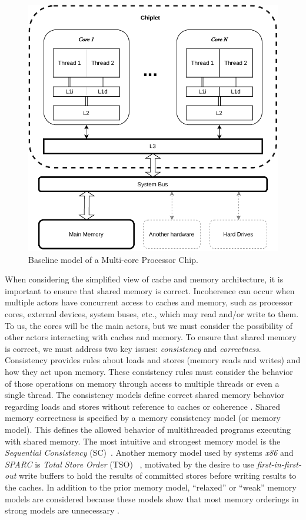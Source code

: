 \begin{figure}[ht!]
    \centering
    \includegraphics[width=0.7\linewidth]{contents//figures/III_2_cpu.pdf}
    \caption{Baseline model of a Multi-core Processor Chip.}
    \label{fig:multi-core-processor}
\end{figure}

When considering the simplified view of cache and memory architecture, it is important to ensure that shared memory is correct. Incoherence can occur when multiple actors have concurrent access to caches and memory, such as processor cores, external devices, system buses, etc., which may read and/or write to them. To us, the cores will be the main actors, but we must consider the possibility of other actors interacting with caches and memory.
To ensure that shared memory is correct, we must address two key issues: \emph{consistency} and \emph{correctness}. Consistency provides rules about loads and stores (memory reads and writes) and how they act upon memory. These consistency rules must consider the behavior of those operations on memory through access to multiple threads or even a single thread. The consistency models define correct shared memory behavior regarding loads and stores without reference to caches or coherence \cite{DBLP_series_synthesis_2020Nagarajan}. Shared memory correctness is specified by a memory consistency model (or memory model). This defines the allowed behavior of multithreaded programs executing with shared memory. The most intuitive and strongest memory model is the \emph{Sequential Consistency} (SC)~\cite{lamport1979how}. Another memory model used by systems \emph{x86} and \emph{SPARC} is \emph{Total Store Order} (TSO) ~\cite{DBLP_conf_tphol_OwensSS09, DBLP_journals_cacm_SewellSONM10, sparc1992sparc}, motivated by the desire to use \emph{first-in-first-out} write buffers to hold the results of committed stores before writing results to the caches.  In addition to the prior memory model, ``relaxed'' or ``weak'' memory models are considered because these models show that most memory orderings in strong models are unnecessary \cite{DBLP_series_synthesis_2020Nagarajan}.

